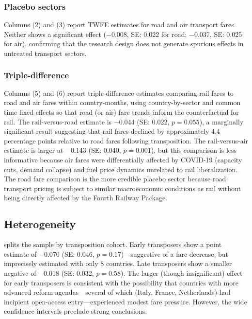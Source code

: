 \documentclass[12pt]{article}
\begin{document}
\subsubsection*{Placebo sectors} Columns (2) and (3) report TWFE estimates for road and air transport fares. Neither shows a significant effect ($-$0.008, SE: 0.022 for road; $-$0.037, SE: 0.025 for air), confirming that the research design does not generate spurious effects in untreated transport sectors.

\subsubsection*{Triple-difference} Columns (5) and (6) report triple-difference estimates comparing rail fares to road and air fares within country-months, using country-by-sector and common time fixed effects so that road (or air) fare trends inform the counterfactual for rail. The rail-versus-road estimate is $-$0.044 (SE: 0.022, $p = 0.055$), a marginally significant result suggesting that rail fares declined by approximately 4.4 percentage points relative to road fares following transposition. The rail-versus-air estimate is larger at $-$0.143 (SE: 0.040, $p = 0.001$), but this comparison is less informative because air fares were differentially affected by COVID-19 (capacity cuts, demand collapse) and fuel price dynamics unrelated to rail liberalization. The road fare comparison is the more credible placebo sector because road transport pricing is subject to similar macroeconomic conditions as rail without being directly affected by the Fourth Railway Package.

\subsection{Heterogeneity}



 splits the sample by transposition cohort. Early transposers show a point estimate of $-$0.070 (SE: 0.046, $p = 0.17$)---suggestive of a fare decrease, but imprecisely estimated with only 8 countries. Late transposers show a smaller negative of $-$0.018 (SE: 0.032, $p = 0.58$). The larger (though insignificant) effect for early transposers is consistent with the possibility that countries with more advanced reform agendas---several of which (Italy, France, Netherlands) had incipient open-access entry---experienced modest fare pressure. However, the wide confidence intervals preclude strong conclusions.
\end{document}
